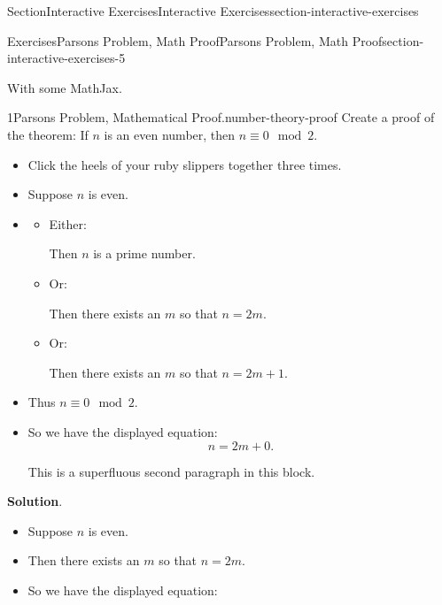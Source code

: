 \documentclass[twoside,10pt,]{article}
\newcommand{\blocktitlefont}{\relax}
\numberwithin{equation}{section}
\begin{document}
\begin{sectionptx}{Section}{Interactive Exercises}{}{Interactive Exercises}{}{}{section-interactive-exercises}
%
%
\typeout{************************************************}
\typeout{************************************************}
%
\begin{exercises-subsection}{Exercises}{Parsons Problem, Math Proof}{}{Parsons Problem, Math Proof}{}{}{section-interactive-exercises-5}
\begin{introduction}{}%
With some MathJax.%
\end{introduction}%
\begin{divisionexercise}{1}{Parsons Problem, Mathematical Proof.}{}{number-theory-proof}%
%
Create a proof of the theorem: If \(n\) is an even number, then \(n\equiv 0\mod 2\).%
\par
%
\begin{itemize}[label=\textbullet]
\item{}Click the heels of your ruby slippers together three times.%
\item{}Suppose \(n\) is even.%
\item{}%
\begin{itemize}[label=]
\item{}Either:%
\par
Then \(n\) is a prime number.%
\item{}Or:%
\par
Then there exists an \(m\) so that \(n = 2m\).%
\item{}Or:%
\par
Then there exists an \(m\) so that \(n = 2m + 1\).%
\end{itemize}
%
\item{}Thus \(n\equiv 0\mod 2\).%
\item{}So we have the displayed equation:%
\begin{equation*}
n = 2m + 0\text{.}
\end{equation*}
%
\par
This is a superfluous second paragraph in this block.%
\end{itemize}
%
\par\smallskip%
\noindent\textbf{\blocktitlefont Solution}.\hypertarget{number-theory-proof-4}{}\quad{}%
\begin{itemize}[label=\textbullet]
\item{}Suppose \(n\) is even.%
\item{}Then there exists an \(m\) so that \(n = 2m\).%
\item{}So we have the displayed equation:%
\begin{equation*}

\end{equation*}
\end{itemize}
\end{divisionexercise}
\end{exercises-subsection}
\end{sectionptx}
\end{document}
